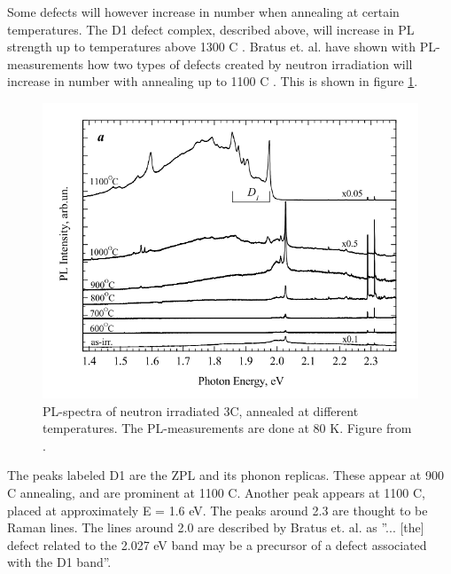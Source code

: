 \documentclass[a4paper,12pt]{article}
\begin{document}
Some defects will however increase in number when annealing at certain temperatures. The D1 defect complex, described above, will increase in PL strength up to temperatures above 1300 C \cite{L.Patrick1971}. Bratus et. al. have shown with PL-measurements how two types of defects created by neutron irradiation will increase in number with annealing up to 1100 C \cite{Bratus2013}. This is shown in figure \ref{fig:annealing1}.

\begin{figure}[H]
\begin{center}
\includegraphics[scale=0.6]{annealing1.png}
\caption{PL-spectra of neutron irradiated 3C, annealed at different temperatures. The PL-measurements are done at 80 K.  Figure from \cite{Bratus2013}.
\label{fig:annealing1}}
\end{center}
\end{figure}

The peaks labeled D1 are the ZPL and its phonon replicas. These appear at 900 C annealing, and are prominent at 1100 C. Another peak appears at 1100 C, placed at approximately E = 1.6 eV. The peaks around 2.3 are thought to be Raman lines. The lines around 2.0 are described by Bratus et. al. as ''... [the] defect related to the 2.027 eV band may be a precursor of a defect associated with the D1 band''.


\newpage

\small


\end{document}
